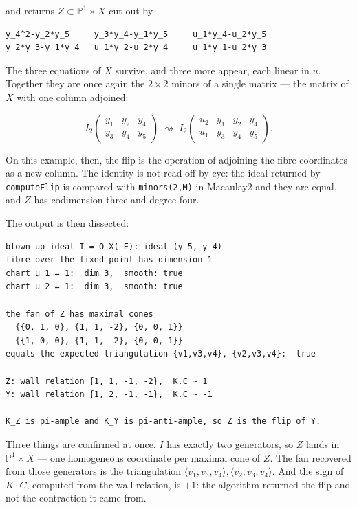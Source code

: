 \documentclass[11pt,reqno]{amsart}
\newcommand{\PP}{\ensuremath{\mathbb{P}}}
\theoremstyle{plain}
\theoremstyle{definition}
\begin{document}
\noindent
and returns \(Z \subset \PP^1 \times X\) cut out by

\begin{verbatim}
y_4^2-y_2*y_5     y_3*y_4-y_1*y_5     u_1*y_4-u_2*y_5
y_2*y_3-y_1*y_4   u_1*y_2-u_2*y_4     u_1*y_1-u_2*y_3
\end{verbatim}

\noindent
The three equations of \(X\) survive, and three more appear, each linear
in \(u\). Together they are once again the \(2 \times 2\) minors of a
single matrix --- the matrix of \(X\) with one column adjoined:

\[I_2\begin{pmatrix} y_1 & y_2 & y_4 \\ y_3 & y_4 & y_5 \end{pmatrix}
  \;\rightsquigarrow\;
  I_2\begin{pmatrix} u_2 & y_1 & y_2 & y_4 \\
                     u_1 & y_3 & y_4 & y_5 \end{pmatrix}.\]

On this example, then, the flip is the operation of adjoining the fibre
coordinates as a new column. The identity is not read off by eye: the
ideal returned by \texttt{computeFlip} is compared with
\texttt{minors(2,M)} in Macaulay2 and they are equal, and \(Z\) has
codimension three and degree four.

The output is then dissected:

\begin{verbatim}
blown up ideal I = O_X(-E): ideal (y_5, y_4)
fibre over the fixed point has dimension 1
chart u_1 = 1:  dim 3,  smooth: true
chart u_2 = 1:  dim 3,  smooth: true

the fan of Z has maximal cones
  {{0, 1, 0}, {1, 1, -2}, {0, 0, 1}}
  {{1, 0, 0}, {1, 1, -2}, {0, 0, 1}}
equals the expected triangulation {v1,v3,v4}, {v2,v3,v4}:  true

Z: wall relation {1, 1, -1, -2},  K.C ~ 1
Y: wall relation {1, 2, -1, -1},  K.C ~ -1

K_Z is pi-ample and K_Y is pi-anti-ample, so Z is the flip of Y.
\end{verbatim}

Three things are confirmed at once. \(I\) has exactly two generators, so
\(Z\) lands in \(\PP^1 \times X\) --- one homogeneous coordinate per
maximal cone of \(Z\). The fan recovered from those generators is the
triangulation
\(\langle v_1,v_3,v_4\rangle, \langle v_2,v_3,v_4\rangle\). And the sign
of \(K \cdot C\), computed from the wall relation, is \(+1\): the
algorithm returned the flip and not the contraction it came from.
\end{document}
